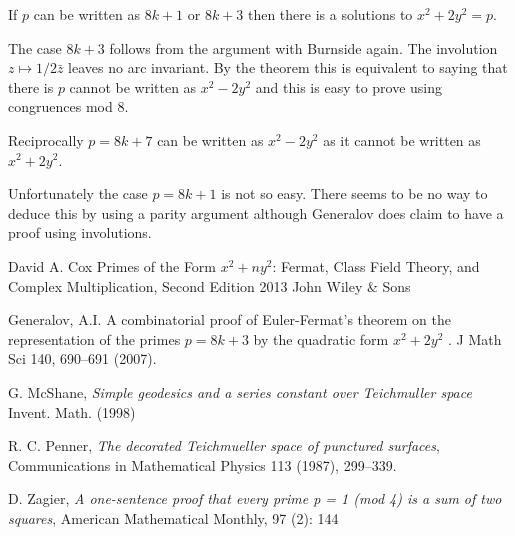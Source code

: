 \documentclass[12pt,a4paper]{amsart}
\begin{document}
If $p$ can be written as $8k+1$ or $8k+3$ then there is a solutions to $x^2 + 2 y^2 = p$.

The case $8k+3$ follows from the argument with Burnside again. The involution $z \mapsto 1/2 \bar{z}$ leaves no arc invariant.
By the theorem this is equivalent to saying that there is $p$ cannot be written as $x^2 - 2 y^2$ and this is easy to prove using congruences mod $8$.	

Reciprocally $p= 8k+7$ can be written as $x^2 - 2 y^2$  as it cannot be written as $x^2 + 2 y^2$.

Unfortunately the case $p = 8k+1$ is not so easy. There seems to be no way to deduce this by using a parity argument
although Generalov  \cite{Generalov}  does claim to have a  proof using involutions.

David A. Cox
Primes of the Form $x^2 + ny^2$: Fermat, Class Field Theory, and Complex Multiplication, Second Edition
2013 John Wiley & Sons


Generalov, A.I. 
A combinatorial proof of Euler-Fermat’s theorem on the representation of the primes $ p=8k+3$ by the quadratic form $x^2+2y^2$ . J Math Sci 140, 690–691 (2007).

G. McShane,
\textit{Simple geodesics and a series constant over Teichmuller space}
Invent. Math. (1998)


R. C. Penner, 
\textit{The decorated Teichmueller space of punctured surfaces}, 
Communications in Mathematical Physics 113 (1987), 299–339.




D. Zagier,
 \textit{A one-sentence proof that every prime p = 1 (mod 4) is a sum of two squares}, 
 American Mathematical Monthly, 97 (2): 144
 
 







 
\end{document}

